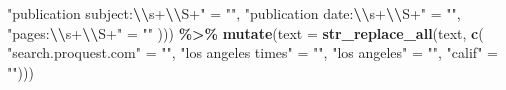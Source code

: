 \documentclass[
]{article}
\newenvironment{Shaded}{\begin{snugshade}}{\end{snugshade}}
\newcommand{\AttributeTok}[1]{\textcolor[rgb]{0.13,0.29,0.53}{#1}}
\newcommand{\FunctionTok}[1]{\textcolor[rgb]{0.13,0.29,0.53}{\textbf{#1}}}
\newcommand{\NormalTok}[1]{#1}
\newcommand{\OtherTok}[1]{\textcolor[rgb]{0.56,0.35,0.01}{#1}}
\newcommand{\SpecialCharTok}[1]{\textcolor[rgb]{0.81,0.36,0.00}{\textbf{#1}}}
\newcommand{\StringTok}[1]{\textcolor[rgb]{0.31,0.60,0.02}{#1}}
\begin{document}
\begin{Shaded}
\begin{Highlighting}[]
    \StringTok{"publication subject:}\SpecialCharTok{\textbackslash{}\textbackslash{}}\StringTok{s+}\SpecialCharTok{\textbackslash{}\textbackslash{}}\StringTok{S+"} \OtherTok{=} \StringTok{""}\NormalTok{,}
    \StringTok{"publication date:}\SpecialCharTok{\textbackslash{}\textbackslash{}}\StringTok{s+}\SpecialCharTok{\textbackslash{}\textbackslash{}}\StringTok{S+"} \OtherTok{=} \StringTok{""}\NormalTok{,}
    \StringTok{"pages:}\SpecialCharTok{\textbackslash{}\textbackslash{}}\StringTok{s+}\SpecialCharTok{\textbackslash{}\textbackslash{}}\StringTok{S+"} \OtherTok{=} \StringTok{""}
\NormalTok{  ))) }\SpecialCharTok{\%\textgreater{}\%}
  \FunctionTok{mutate}\NormalTok{(}\AttributeTok{text =} \FunctionTok{str\_replace\_all}\NormalTok{(text, }\FunctionTok{c}\NormalTok{(}
    \StringTok{"search.proquest.com"} \OtherTok{=} \StringTok{""}\NormalTok{,}
    \StringTok{"los angeles times"} \OtherTok{=} \StringTok{""}\NormalTok{,}
    \StringTok{"los angeles"} \OtherTok{=} \StringTok{""}\NormalTok{,}
    \StringTok{"calif"} \OtherTok{=} \StringTok{""}\NormalTok{))) }
\end{Highlighting}
\end{Shaded}
\end{document}
